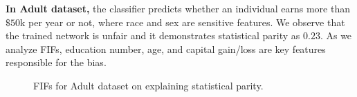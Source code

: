 \textbf{In Adult dataset,} the classifier predicts whether an individual earns more than $ \$50 $k per year or not, where race and sex are sensitive features. We observe that the trained network is unfair and it demonstrates statistical parity as $ 0.23 $. As we analyze FIFs,  education number, age, and capital gain/loss are key features responsible for the bias. 

\begin{figure}[!t]
	\begin{minipage}{0.45\textwidth}
		\centering
	\end{minipage}
	\begin{minipage}{0.5\textwidth}
		\centering
	\end{minipage}
	\caption[FIFs for Adult dataset]{FIFs for Adult dataset on explaining statistical parity.}\label{fairness_fairXplainer_fig:individual_vs_intersectional_influence_adult}
\end{figure}



